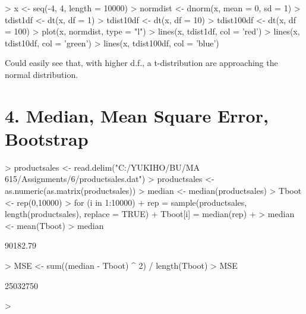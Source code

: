 \documentclass[a4paper]{article}
\begin{document}
\begin{Schunk}
\begin{Sinput}
> x <- seq(-4, 4, length = 10000)
> normdist <- dnorm(x, mean = 0, sd = 1)
> tdist1df <- dt(x, df = 1)
> tdist10df <- dt(x, df = 10)
> tdist100df <- dt(x, df = 100)
> plot(x, normdist, type = "l")
> lines(x, tdist1df, col = 'red')
> lines(x, tdist10df, col = 'green')
> lines(x, tdist100df, col = 'blue')
\end{Sinput}
\end{Schunk}

Could easily see that, with higher d.f., a t-distribution are approaching the normal distribution.

\section{4. Median, Mean Square Error, Bootstrap}

\begin{Schunk}
\begin{Sinput}
> productsales <- read.delim("C:/YUKIHO/BU/MA 615/Assignments/6/productsales.dat")
> productsales <- as.numeric(as.matrix(productsales))
> median <- median(productsales)
> Tboot <- rep(0,10000)
> for (i in 1:10000){
+   rep = sample(productsales, length(productsales), replace = TRUE)
+   Tboot[i] = median(rep)
+   }
> median <- mean(Tboot)
> median
\end{Sinput}
\begin{Soutput}
[1] 90182.79
\end{Soutput}
\begin{Sinput}
> MSE <- sum((median - Tboot) ^ 2) / length(Tboot)
> MSE
\end{Sinput}
\begin{Soutput}
[1] 25032750
\end{Soutput}
\begin{Sinput}
> 
\end{Sinput}
\end{Schunk}
\end{document}
